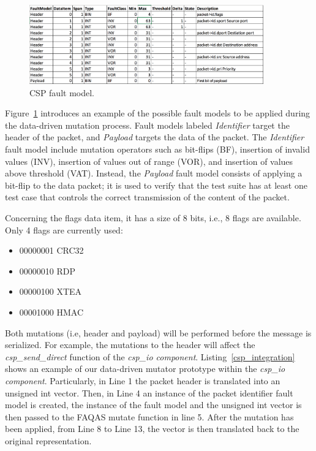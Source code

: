 \begin{figure}[h]
  \centering
    \includegraphics[width=0.9\textwidth]{images/FaultModelCSP_temp}
      \caption{CSP fault model.}
      \label{fig:csp_faultmodel}
\end{figure}

Figure~\ref{fig:csp_faultmodel} introduces an example of the possible fault models to be applied during the data-driven mutation process.
Fault models labeled \emph{Identifier} target the header of the packet, and \emph{Payload} targets the data of the packet.
The \emph{Identifier} fault model include mutation operators such as bit-flips (BF), insertion of invalid values (INV), insertion of values out of range (VOR), and insertion of values above threshold (VAT).
Instead, the \emph{Payload} fault model consists of applying a bit-flip to the data packet; it is used to verify that the test suite has at least one test case that controls the correct transmission of the content of the packet.

Concerning the flags data item, it has a size of 8 bits, i.e., 8 flags are available. Only 4 flags are currently used:
\begin{itemize}
\item 00000001              CRC32
\item 00000010             RDP
\item 00000100             XTEA
\item 00001000             HMAC
\end{itemize}



Both mutations (i.e, header and payload) will be performed before the message is serialized. 
For example, the mutations to the header will affect the \emph{csp\_send\_direct} function of the \emph{csp\_io component}. 
Listing~\ref{csp_integration} shows an example of our data-driven mutator prototype within the \emph{csp\_io component}. 
Particularly, in Line 1 the packet header is translated into an unsigned int vector. 
Then, in Line 4 an instance of the packet identifier fault model is created, 
the instance of the fault model and the unsigned int vector is then passed to the FAQAS mutate function in line 5.
After the mutation has been applied, from Line 8 to Line 13, the vector is then translated back to the original representation.
 


